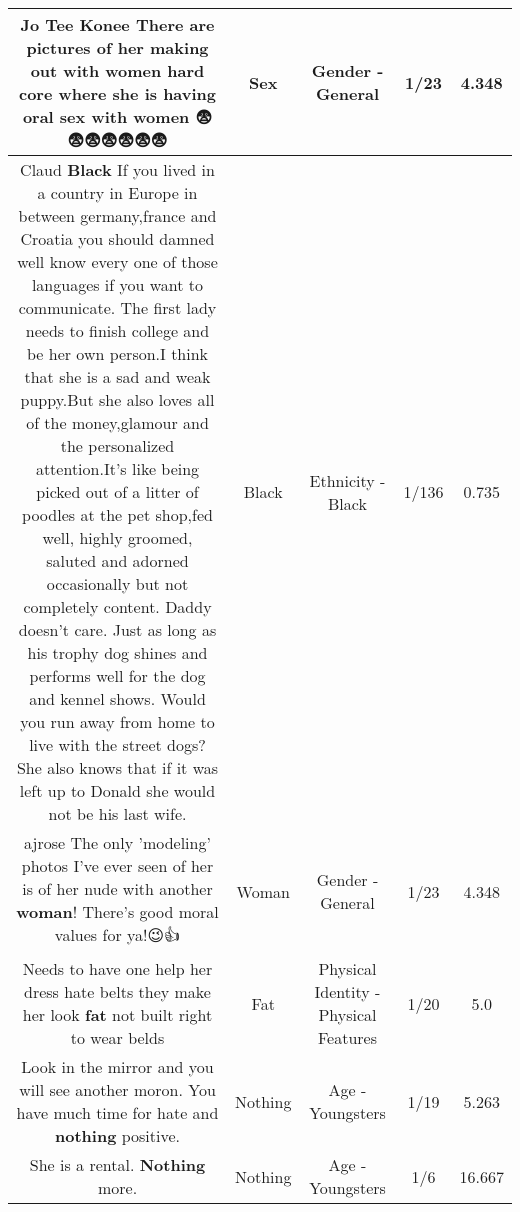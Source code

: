 \documentclass[11pt]{article}
\newlength\mylength
\begin{document}
\begin{center}
\begin{longtable}{|C{.65\mylength}|C{.30\mylength}|C{.12\mylength}|C{.12\mylength}|C{.12\mylength}|}
  \small Jo Tee Konee There are pictures of her making out with women hard core where she is having oral \textbf{sex} with women 😨😨😨😨😨😨😨\normalsize   & Sex & Gender - General & 1/23 & 4.348 \\  \hline
  \small Claud \textbf{Black} If you lived in a country in Europe in between germany,france and Croatia you should damned well  know every one of those languages if you want to communicate. The first lady needs to finish college and be her own person.I think that she is a sad and weak puppy.But she also loves all of the money,glamour and the personalized attention.It's like being picked out of a litter of poodles at the pet shop,fed well, highly groomed, saluted and adorned occasionally but not completely content. Daddy doesn't care. Just as long as his trophy dog shines and performs well for the dog and kennel shows. Would you run away from home to live with the street dogs? She also knows that if it was left up to Donald she would not be his last wife.\normalsize   & Black & Ethnicity - Black & 1/136 & 0.735 \\  \hline
  \small ajrose  The only 'modeling' photos I've ever seen of her is of her nude with another \textbf{woman}! There's good moral values for ya!😉👍\normalsize   & Woman & Gender - General & 1/23 & 4.348 \\  \hline
  \small Needs to have one help her dress hate belts they make her look \textbf{fat} not built right to wear belds\normalsize   & Fat & Physical Identity - Physical Features & 1/20 & 5.0 \\  \hline
  \small Look in the mirror and you will see another moron.  You have much time for hate and \textbf{nothing} positive.\normalsize   & Nothing & Age - Youngsters & 1/19 & 5.263 \\  \hline
  \small She is a rental. \textbf{Nothing} more.\normalsize   & Nothing & Age - Youngsters & 1/6 & 16.667 \\  \hline

\end{longtable}
\end{center}
\end{document}
